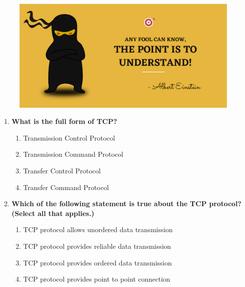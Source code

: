 \setlength{\columnsep}{3pt}
\begin{flushleft}
	
	\paragraph{}
	\bigskip
	
	\begin{figure}[h!]
		\centering
		\includegraphics[scale=.2]{content/practise.jpg}
	\end{figure}	
	\begin{enumerate}
		
		\item \textbf{What is the full form of TCP?}
		\begin{enumerate}[label=(\alph*)]
			\item Transmission Control Protocol  %
			\item Transmission Command Protocol
			\item Transfer Control Protocol
			\item Transfer Command Protocol
		\end{enumerate}
		\bigskip
		\bigskip
		
		\item \textbf{Which of the following statement is true about the TCP protocol? (Select all that applies.)}
		\begin{enumerate}[label=(\alph*)]
			\item TCP protocol allows unordered data transmission
			\item TCP protocol provides reliable data transmission %
			\item TCP protocol provides ordered data transmission  %
			\item TCP protocol provides point to point connection  %
		\end{enumerate}
		\bigskip
		\bigskip	
		

\end{enumerate}
\end{flushleft}
